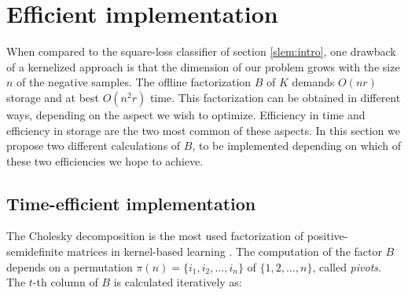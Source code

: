
\section{Efficient implementation}\label{eff_imp}


When compared to the square-loss classifier of section \ref{slem:intro}, one drawback of a kernelized approach is that the dimension of our problem grows with the size $n$ of the negative samples.
The offline factorization $B$ of $K$ demands $O(nr)$ storage and at best $O(n^2r)$ time. This factorization can be obtained in different ways, depending on the aspect we wish to optimize. Efficiency in time and efficiency in storage are the two most common of these aspects. In this section we propose two different calculations of $B$, to be implemented depending on which of these two efficiencies we hope to achieve.



\subsection{Time-efficient implementation}
The Cholesky decomposition is the most used factorization of positive-semidefinite matrices in kernel-based learning \cite{BaJo02,BaJo05,FiSc01}. 
The computation of the factor $B$ depends on a permutation $\pi(n) =\{i_1,i_2,\dots,i_n\}$ of $\{1,2,\dots, n\}$, called \textit{pivots}. The $t$-th column of $B$ is calculated iteratively as:


